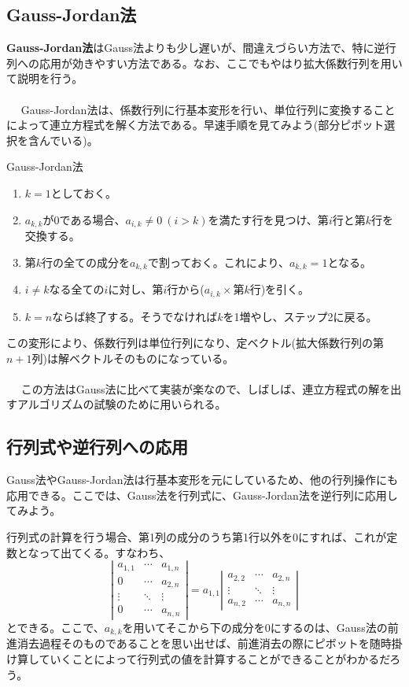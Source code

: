 \subsection{Gauss-Jordan法}
\textbf{Gauss-Jordan法}はGauss法よりも少し遅いが、間違えづらい方法で、特に逆行列への応用が効きやすい方法である。なお、ここでもやはり拡大係数行列を用いて説明を行う。
\\ \\　
Gauss-Jordan法は、係数行列に行基本変形を行い、単位行列に変換することによって連立方程式を解く方法である。早速手順を見てみよう(部分ピボット選択を含んでいる)。
\begin{itembox}[l]{Gauss-Jordan法}
\begin{enumerate}
\item $k=1$としておく。
\item $a_{k,k}$が0である場合、$a_{i,k}\neq0\ (i>k)$を満たす行を見つけ、第$i$行と第$k$行を交換する。
\item 第$k$行の全ての成分を$a_{k,k}$で割っておく。これにより、$a_{k,k}=1$となる。
\item $i\neq k$なる全ての$i$に対し、第$i$行から($a_{i,k}\times$第$k$行)を引く。
\item $k=n$ならば終了する。そうでなければ$k$を1増やし、ステップ2に戻る。
\end{enumerate}
\end{itembox}

この変形により、係数行列は単位行列になり、定ベクトル(拡大係数行列の第$n+1$列)は解ベクトルそのものになっている。
\\ \\　
この方法はGauss法に比べて実装が楽なので、しばしば、連立方程式の解を出すアルゴリズムの試験のために用いられる。

\subsection{行列式や逆行列への応用}
Gauss法やGauss-Jordan法は行基本変形を元にしているため、他の行列操作にも応用できる。ここでは、Gauss法を行列式に、Gauss-Jordan法を逆行列に応用してみよう。

行列式の計算を行う場合、第1列の成分のうち第1行以外を0にすれば、これが定数となって出てくる。すなわち、
\begin{equation}
\left|
\begin{array}{ccc}
a_{1,1}&\cdots&a_{1,n}\\
0&\cdots&a_{2,n}\\
\vdots&\ddots&\vdots\\
0&\cdots&a_{n,n}
\end{array}
\right|=a_{1,1}\left|
\begin{array}{ccc}
a_{2,2}&\cdots&a_{2,n}\\
\vdots&\ddots&\vdots\\
a_{n,2}&\cdots&a_{n,n}
\end{array}
\right|
\end{equation}
とできる。ここで、$a_{k,k}$を用いてそこから下の成分を0にするのは、Gauss法の前進消去過程そのものであることを思い出せば、前進消去の際にピボットを随時掛け算していくことによって行列式の値を計算することができることがわかるだろう。

